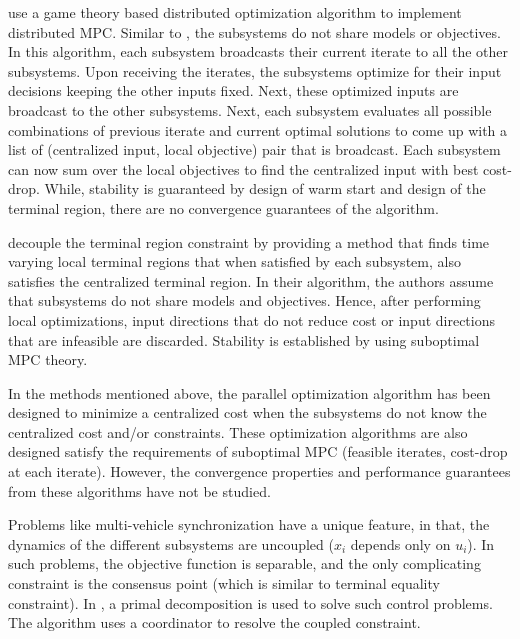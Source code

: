 \documentclass[10pt]{article}
\theoremstyle{definition}
\begin{document}
 \citet{maestre:pena:camacho:2011}  use a game theory based distributed optimization algorithm to implement distributed MPC. Similar to \citet{maestre:pena:camacho:alamo:2011}, the subsystems do not share models or objectives. In this algorithm, each subsystem broadcasts their current iterate to all the other subsystems. Upon receiving the iterates, the subsystems optimize for their input decisions keeping the other inputs fixed. Next, these optimized inputs are broadcast to the other subsystems. Next, each subsystem evaluates all possible combinations of previous iterate and current optimal solutions to come up with a list of (centralized input, local objective) pair that is broadcast. Each subsystem can now sum over the local objectives to find the centralized input with best cost-drop. While, stability is guaranteed by design of warm start and design of the terminal region, there are no convergence guarantees of the algorithm.

 \citet{muller:revle:allgower:2012} decouple the terminal region constraint by providing a method that finds time varying local terminal regions that when satisfied by each subsystem, also satisfies the centralized terminal region. In their algorithm, the authors assume that subsystems do not share models and objectives. Hence, after performing local optimizations, input directions that do not reduce cost or input directions that are infeasible are discarded. Stability is established by using suboptimal MPC theory. 
 
 In the methods mentioned above, the parallel optimization algorithm has been designed to minimize a centralized cost when the subsystems do not know the centralized cost and/or constraints. These optimization algorithms are also designed satisfy the requirements of suboptimal MPC (feasible iterates, cost-drop at each iterate). However, the convergence properties and performance guarantees from these algorithms have not be studied.
 
Problems like multi-vehicle synchronization have a unique feature, in that, the dynamics of the different subsystems are uncoupled ($x_i$ depends only on $u_i$). In such problems, the objective function is separable, and the only complicating constraint is the consensus point (which is similar to terminal equality constraint). In \citet{johansson:speranzon:johansson:johansson:2006}, a primal decomposition is used to solve such control problems. The algorithm uses a coordinator to resolve the coupled constraint.
\end{document}
